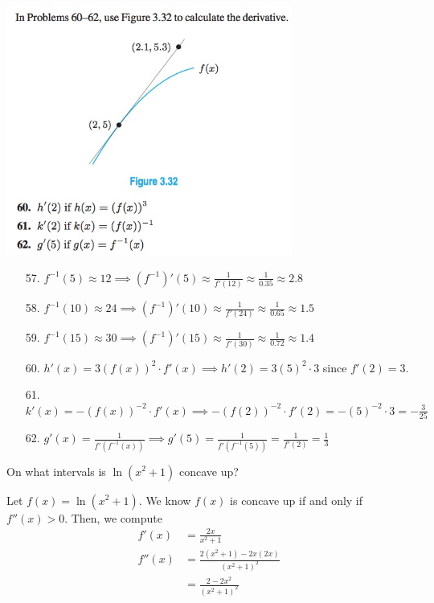\documentclass[11pt]{exam}
\begin{document}
\begin{questions}
\begin{multicols}{2}
\columnbreak

\includegraphics[width=3.7in]{Figures/no60to62.jpg}
\end{multicols}
\begin{solution}
  \begin{enumerate}
  \item[57.] \(f^{-1}(5) \approx 12 \implies (f^{-1})'(5) \approx \frac{1}{f'(12)} \approx \frac{1}{0.35} \approx 2.8\)
  \item[58.] \(f^{-1}(10) \approx 24 \implies (f^{-1})'(10) \approx \frac{1}{f'(24)} \approx \frac{1}{0.65} \approx 1.5\)
  \item[59.]\(f^{-1}(15) \approx 30 \implies (f^{-1})'(15) \approx \frac{1}{f'(30)} \approx \frac{1}{0.72} \approx 1.4\) 
  \item[60.] \(h'(x) = 3(f(x))^2 \cdot f'(x) \implies h'(2) = 3(5)^2
    \cdot 3\) since \(f'(2) = 3\).
  \item[61.] \(k'(x) = -(f(x))^{-2} \cdot f'(x) \implies -(f(2))^{-2}
    \cdot f'(2) = -(5)^{-2} \cdot 3 = -\frac{3}{25}\)
  \item[62.] \(g'(x) = \frac{1}{f'(f^{-1}(x))} \implies g'(5)=
    \frac{1}{f'(f^{-1}(5))} = \frac{1}{f'(2)} = \frac{1}{3}\)
  \end{enumerate}
\end{solution}
\question On what intervals is $\ln(x^2+1)$ concave up?
  \begin{solution}
    Let \(f(x) = \ln(x^2+1)\). We know \(f(x)\) is concave up if and
    only if \(f''(x) > 0\). Then, we compute
    \begin{align*}
      f'(x) & = \frac{2x}{x^2+1} \\
      f''(x) & = \frac{2(x^2+1)-2x(2x)}{(x^2+1)^2} \\
      & = \frac{2-2x^2}{(x^2+1)^2}

\end{align*}
\end{solution}
\end{questions}
\end{document}
